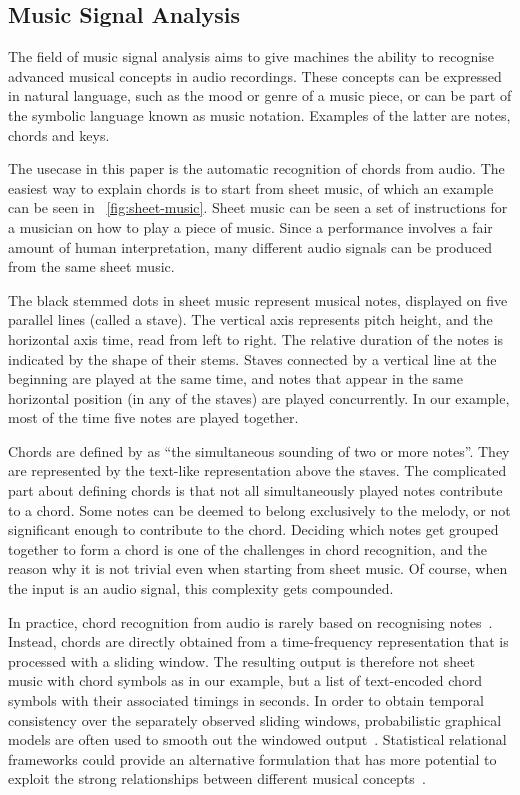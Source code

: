 \documentclass[letterpaper]{article} %
\newcommand{\figref}[1]{\figurename~\ref{fig:#1}} %
\begin{document}
\subsection{Music Signal Analysis}

The field of music signal analysis aims to give machines the ability to recognise advanced musical concepts in audio recordings. These concepts can be expressed in natural language, such as the mood or genre of a music piece, or can be part of the symbolic language known as music notation.
Examples of the latter are notes, chords and keys.

The usecase in this paper is the automatic recognition of chords from audio. The easiest way to explain chords is to start from sheet music, of which an example can be seen in \figref{sheet-music}. Sheet music can be seen a set of instructions for a musician on how to play a piece of music.
Since a performance involves a fair amount of human interpretation, many different audio signals can be produced from the same sheet music.

The black stemmed dots in sheet music represent musical notes, displayed on five parallel lines (called a stave). The vertical axis represents pitch height, and the horizontal axis time, read from left to right. The relative duration of the notes is indicated by the shape of their stems. Staves connected by a vertical line at the beginning are played at the same time, and notes that appear in the same horizontal position (in any of the staves) are played concurrently. In our example, most of the time five notes are played together.

Chords are defined by \citeauthor{grovemusic} as ``the simultaneous sounding of two or more notes''. They are represented by the text-like representation above the staves. The complicated part about defining chords is that not all simultaneously played notes contribute to a chord. Some notes can be deemed to belong exclusively to the melody, or not significant enough to contribute to the chord. Deciding which notes get grouped together to form a chord is one of the challenges in chord recognition, and the reason why it is not trivial even when starting from sheet music. Of course, when the input is an audio signal, this complexity gets compounded.

In practice, chord recognition from audio is rarely based on recognising notes~\cite{pauwels2019ismir}. Instead, chords are directly obtained from a time-frequency representation that is processed with a sliding window. The resulting output is therefore not sheet music with chord symbols as in our example, but a list of text-encoded chord symbols with their associated timings in seconds. In order to obtain temporal consistency over the separately observed sliding windows, probabilistic graphical models are often used to smooth out the windowed output~\cite{pauwels2019ismir}. Statistical relational frameworks could provide an alternative formulation that has more potential to exploit the strong relationships between different musical concepts~\cite{papadopoulos2017taslp}.
\end{document}
